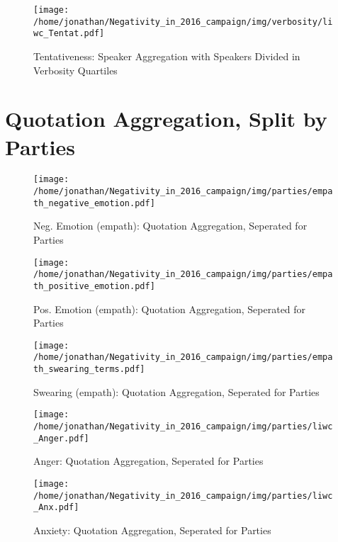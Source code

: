 \begin{figure}[h]\centering
\texttt{[image: /home/jonathan/Negativity\_in\_2016\_campaign/img/verbosity/liwc\_Tentat.pdf]}
\caption{Tentativeness: Speaker Aggregation with Speakers Divided in Verbosity Quartiles}
\label{fig: verbosity_Tentativeness}
\end
{figure}

\clearpage
\pagebreak

\section{Quotation Aggregation, Split by Parties}

\begin{figure}[h]\centering
\texttt{[image: /home/jonathan/Negativity\_in\_2016\_campaign/img/parties/empath\_negative\_emotion.pdf]}
\caption{Neg. Emotion (empath): Quotation Aggregation, Seperated for Parties}
\label{fig: parties_Neg. Emotion (empath)}
\end
{figure}

\begin{figure}[h]\centering
\texttt{[image: /home/jonathan/Negativity\_in\_2016\_campaign/img/parties/empath\_positive\_emotion.pdf]}
\caption{Pos. Emotion (empath): Quotation Aggregation, Seperated for Parties}
\label{fig: parties_Pos. Emotion (empath)}
\end
{figure}

\begin{figure}[h]\centering
\texttt{[image: /home/jonathan/Negativity\_in\_2016\_campaign/img/parties/empath\_swearing\_terms.pdf]}
\caption{Swearing (empath): Quotation Aggregation, Seperated for Parties}
\label{fig: parties_Swearing (empath)}
\end
{figure}

\begin{figure}[h]\centering
\texttt{[image: /home/jonathan/Negativity\_in\_2016\_campaign/img/parties/liwc\_Anger.pdf]}
\caption{Anger: Quotation Aggregation, Seperated for Parties}
\label{fig: parties_Anger}
\end
{figure}

\begin{figure}[h]\centering
\texttt{[image: /home/jonathan/Negativity\_in\_2016\_campaign/img/parties/liwc\_Anx.pdf]}
\caption{Anxiety: Quotation Aggregation, Seperated for Parties}
\label{fig: parties_Anxiety}
\end
{figure}

